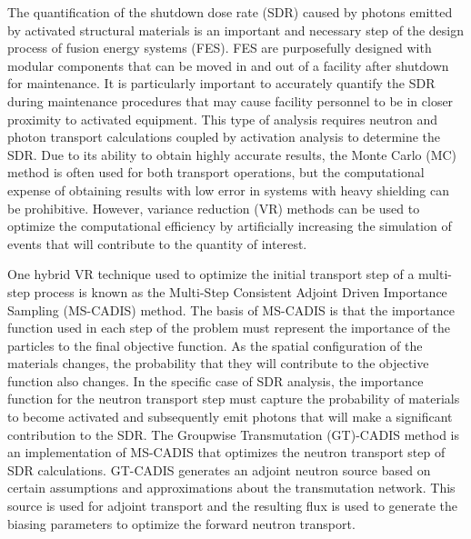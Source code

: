
\vcinfo{}

%
%
The quantification of the 
shutdown dose rate (SDR) caused by photons emitted by activated structural
materials is an important and necessary step of the design process of fusion energy
systems (FES).
FES are purposefully designed with modular components that can be moved in and
out of a facility after shutdown for maintenance. 
  It is particularly important to accurately quantify the SDR
during maintenance procedures that may cause facility personnel to be in closer
proximity to activated equipment.
This type of analysis requires neutron and photon transport calculations coupled by activation analysis to determine the SDR.
Due to its ability to obtain highly accurate results, the Monte Carlo (MC) method is often used for both transport operations, but the computational expense of obtaining results with low
error 
in systems with heavy shielding can be prohibitive.  
However, variance reduction (VR)
methods can be used to optimize the computational efficiency by artificially
increasing the simulation of
events that will contribute to the quantity of interest.

One hybrid VR technique used to optimize the initial transport step of a
multi-step process is known as 
the Multi-Step Consistent Adjoint Driven Importance Sampling
(MS-CADIS) method. 
The basis of MS-CADIS is that the importance %
function used
in each step of the problem must represent the importance of the particles to
the final objective function.  
As the spatial configuration of the materials
changes, the probability that they will contribute to the objective function
also changes.
In the specific case of SDR analysis, 
the importance function for the neutron transport step
must capture the probability of materials to become activated and subsequently emit photons that
will make a significant contribution to the SDR.
The Groupwise Transmutation (GT)-CADIS method 
is an implementation of MS-CADIS
that optimizes the neutron transport step of SDR calculations.
GT-CADIS generates an adjoint
neutron source based on certain assumptions and approximations about the
transmutation network.  
This source is used for adjoint transport and the resulting flux is used to
generate the biasing parameters to optimize the forward neutron transport.

